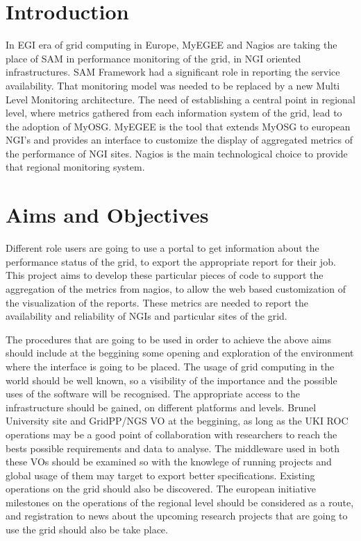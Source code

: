 \section{Introduction}

In EGI era of grid computing in Europe, MyEGEE and Nagios are taking the place of SAM in performance monitoring of the grid, in NGI oriented infrastructures. SAM Framework had a significant role in reporting the service availability. That monitoring model was needed to be replaced by a new Multi Level Monitoring architecture. The need of establishing a central point in regional level, where metrics gathered from each information system of the grid, lead to the adoption of MyOSG. MyEGEE is the tool that extends MyOSG to european NGI's and provides an interface to customize the display of aggregated metrics of the performance of NGI sites. Nagios is the main technological choice to provide that regional monitoring system.

\section{Aims and Objectives}

Different role users are going to use a portal to get information about the performance status of the grid, to export the appropriate report for their job. This project aims to develop these particular pieces of code to support the aggregation of the metrics from nagios, to allow the web based customization of the visualization of the reports. These metrics are needed to report the availability and reliability of NGIs and particular sites of the grid.

The procedures that are going to be used in order to achieve the above aims should include at the beggining some opening and exploration of the environment where the interface is going to be placed. The usage of grid computing in the world should be well known, so a visibility of the importance and the possible uses of the software will be recognised. The appropriate access to the infrastructure should be gained, on different platforms and levels. Brunel University site and GridPP/NGS VO at the beggining, as long as the UKI ROC operations may be a good point of collaboration with researchers to reach the bests possible requirements and data to analyse. The middleware used in both these VOs should be examined so with the knowlege of running projects and global usage of them may target to export better specifications. Existing operations on the grid should also be discovered. The european initiative milestones on the operations of the regional level should be considered as a route, and registration to news about the upcoming research projects that are going to use the grid should also be take place.

